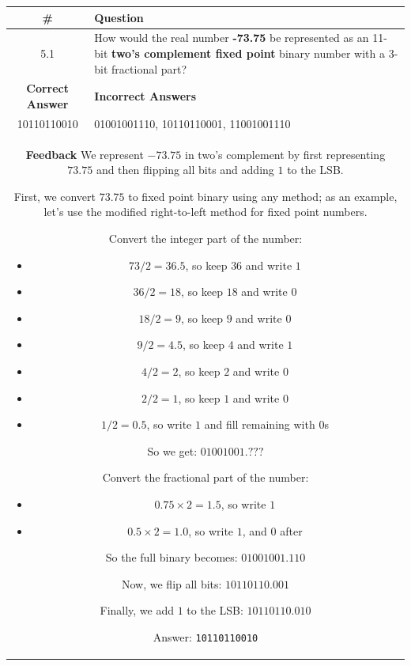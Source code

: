 \begin{tabular}{|c|p{12cm}|}
\hline
\# & Question \\
\hline
5.1 & How would the real number \textbf{-73.75} be represented as an 11-bit \textbf{two's complement fixed point} binary number with a 3-bit fractional part? \\
\hline
\textbf{Correct Answer} & \textbf{Incorrect Answers} \\
10110110010 & 01001001110, 10110110001, 11001001110 \\
\hline
\multicolumn{2}{|p{14cm}|}{
\textbf{Feedback} \newline
We represent $-73.75$ in two's complement by first representing $73.75$ and then flipping all bits and adding $1$ to the LSB.

First, we convert $73.75$ to fixed point binary using any method; as an example, let's use the modified right-to-left method for fixed point numbers.

Convert the integer part of the number:
\begin{itemize}
\item $73 / 2 = 36.5$, so keep $36$ and write $1$
\item $36 / 2 = 18$, so keep $18$ and write $0$
\item $18 / 2 = 9$, so keep $9$ and write $0$
\item $9 / 2 = 4.5$, so keep $4$ and write $1$
\item $4 / 2 = 2$, so keep $2$ and write $0$
\item $2 / 2 = 1$, so keep $1$ and write $0$
\item $1 / 2 = 0.5$, so write $1$ and fill remaining with $0$s
\end{itemize}
So we get: $01001001.???$

Convert the fractional part of the number:
\begin{itemize}
\item $0.75 \times 2 = 1.5$, so write $1$
\item $0.5 \times 2 = 1.0$, so write $1$, and $0$ after
\end{itemize}
So the full binary becomes: $01001001.110$

Now, we flip all bits: $10110110.001$

Finally, we add $1$ to the LSB: $10110110.010$

Answer: \texttt{10110110010}
} \\
\hline
\end{tabular}

